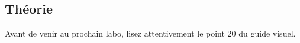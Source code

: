 \documentclass[a4paper,11pt]{article}
\begin{document}
%			
%		
%            
%							

	\subsection{Th\'eorie} 
		Avant de venir au prochain labo, lisez attentivement le point 20 du guide visuel.  
				
            	\par
        
\end{document}
